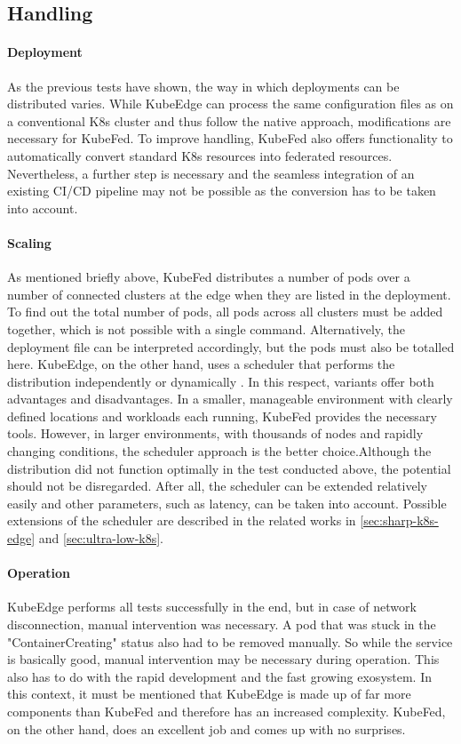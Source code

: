 \documentclass[MSC,Master,english]{twbook}%
\begin{document}
\subsection{Handling}
\label{sec:handling}
\paragraph{Deployment} As the previous tests have shown, the way in which deployments can be distributed varies. While KubeEdge can process the same configuration files as on a conventional \ac{K8s} cluster and thus follow the native approach, modifications are necessary for KubeFed. To improve handling, KubeFed also offers functionality to automatically convert standard \ac{K8s} resources into federated resources. Nevertheless, a further step is necessary and the seamless integration of an existing CI/CD pipeline may not be possible as the conversion has to be taken into account.

\paragraph{Scaling} As mentioned briefly above, KubeFed distributes a number of pods over a number of connected clusters at the edge when they are listed in the deployment. To find out the total number of pods, all pods across all clusters must be added together, which is not possible with a single command. Alternatively, the deployment file can be interpreted accordingly, but the pods must also be totalled here. KubeEdge, on the other hand, uses a scheduler that performs the distribution independently or dynamically \cite{ke-doc-schedule}. In this respect, variants offer both advantages and disadvantages. In a smaller, manageable environment with clearly defined locations and workloads each running, KubeFed provides the necessary tools. However, in larger environments, with thousands of nodes and rapidly changing conditions, the scheduler approach is the better choice.Although the distribution did not function optimally in the test conducted above, the potential should not be disregarded. After all, the scheduler can be extended relatively easily and other parameters, such as latency, can be taken into account. Possible extensions of the scheduler are described in the related works in \autoref{sec:sharp-k8s-edge} and \autoref{sec:ultra-low-k8s}.

\paragraph{Operation} KubeEdge performs all tests successfully in the end, but in case of network disconnection, manual intervention was necessary. A pod that was stuck in the "ContainerCreating" status also had to be removed manually. So while the service is basically good, manual intervention may be necessary during operation. This also has to do with the rapid development and the fast growing exosystem. In this context, it must be mentioned that KubeEdge is made up of far more components than KubeFed and therefore has an increased complexity. KubeFed, on the other hand, does an excellent job and comes up with no surprises.
\end{document}
